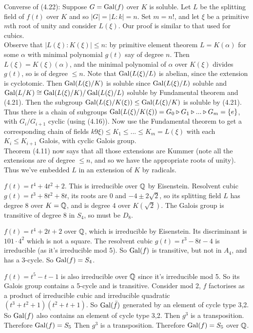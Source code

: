 \documentclass[a4paper]{article}
\begin{document}
Converse of (4.22): Suppose $G = \operatorname{Gal}(f)$ over $K$ is soluble. Let $L$ be the splitting field of $f(t)$ over $K$ and so $|G| = |L:k| =n$. Set $m=n!$, and let $\xi$ be a primitive $m$th root of unity and consider $L(\xi)$. Our proof is similar to that used for cubics.\\
Observe that $|L(\xi):K(\xi)| \leq n$: by primitive element theorem $L=K(\alpha)$ for some $\alpha$ with minimal polynomial $g(t)$ say of degree $n$. Then $L(\xi) = K(\xi)(\alpha)$, and the minimal polynomial of $\alpha$ over $K(\xi)$ divides $g(t)$, so is of degree $\leq n$. Note that $\operatorname{Gal}(L(\xi)/L)$ is abelian, since the extension is cyclotomic. Then $\operatorname{Gal}(L(\xi)/K)$ is soluble since $\operatorname{Gal}(L(\xi) / L)$ soluble and $\operatorname{Gal}(L/K) \cong \operatorname{Gal}(L(\xi)/K) / \operatorname{Gal}(L(\xi)/L)$ soluble by Fundamental theorem and (4.21). Then the subgroup $\operatorname{Gal}(L(\xi)/K(\xi)) \leq \operatorname{Gal}(L(\xi)/K)$ is soluble by (4.21). Thus there is a chain of subgroups $\operatorname{Gal}(L(\xi)/K(\xi)) = G_0 \triangleright G_1 \triangleright ... \triangleright G_m = \{e\}$, with $G_i/G_{i+1}$ cyclic (using (4.16)). Now use the Fundamental theorem to get a corresponding chain of fields $k9\xi) \leq K_1 \leq ... \leq K_m = L(\xi)$ with each $K_i \leq K_{i+1}$ Galois, with cyclic Galois group.\\
Theorem (4.11) now says that all those extensions are Kummer (note all the extensions are of degree $\leq n$, and so we have the appropriate roots of unity). Thus we've embedded $L$ in an extension of $K$ by radicals.

\begin{eg}
$f(t) = t^4+4t^2+2$. This is irreducible over $\mathbb{Q}$ by Eisenstein. Resolvent cubic $g(t) = t^3+8t^2+8t$, its roots are 0 and $-4 \pm 2\sqrt{2}$, so its splitting field $L$ has degree 8 over $K=\mathbb{Q}$, and is degree 4 over $K(\sqrt{2})$. The Galois group is transitive of degree 8 in $S_4$, so must be $D_8$.
\end{eg}

\begin{eg}
$f(t) = t^4+2t+2$ over $\mathbb{Q}$, which is irreducible by Eisenstein. Its discriminant is $101 \cdot 4^2$ which is not a square. The resolvent cubic $g(t) = t^3-8t-4$ is irreducible (as it's irreducible mod 5). So $\operatorname{Gal}(f)$ is transitive, but not in $A_4$, and has a 3-cycle. So $\operatorname{Gal}(f) = S_4$.
\end{eg}

\begin{eg}
$f(t) = t^5-t-1$ is also irreducible over $\mathbb{Q}$ since it's irreducible mod 5. So its Galois group contains a 5-cycle and is transitive. Consider mod 2, $f$ factorises as a product of irreducible cubic and irreducible quadratic $(t^3+t^2+1)(t^2+t+1)$. So $\operatorname{Gal}(\bar{f})$ generated by an element of cycle type 3,2. So $\operatorname{Gal}(f)$ also contains an element of cycle type 3,2. Then $g^3$ is a transposition. Therefore $\operatorname{Gal}(f) = S_5$ Then $g^3$ is a transposition. Therefore $\operatorname{Gal}(f) = S_5$ over $\mathbb{Q}$.
\end{eg}
\end{document}

